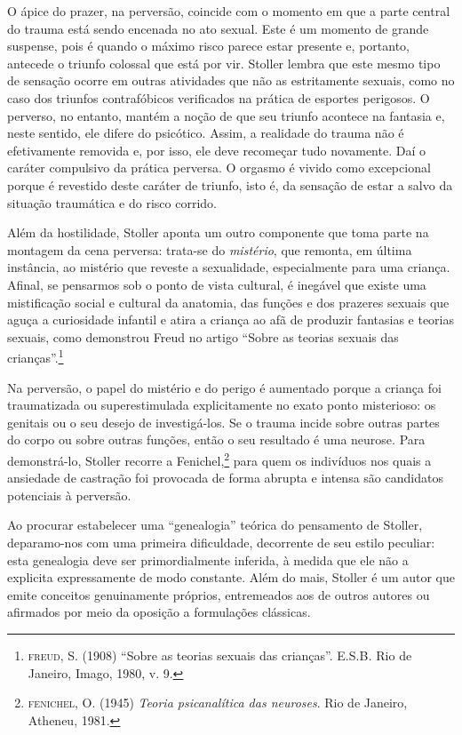 O ápice do prazer, na perversão, coincide com o momento em que a parte
central do trauma está sendo encenada no ato sexual. Este é um momento
de grande suspense, pois é quando o máximo risco parece estar presente
e, portanto, antecede o triunfo colossal que está por vir. Stoller
lembra que este mesmo tipo de sensação ocorre em outras atividades que
não as estritamente sexuais, como no caso dos triunfos contrafóbicos
verificados na prática de esportes perigosos. O perverso, no entanto,
mantém a noção de que seu triunfo acontece na fantasia e, neste sentido,
ele difere do psicótico. Assim, a realidade do trauma não é efetivamente
removida e, por isso, ele deve recomeçar tudo novamente. Daí o caráter
compulsivo da prática perversa. O orgasmo é vivido como excepcional
porque é revestido deste caráter de triunfo, isto é, da sensação de
estar a salvo da situação traumática e do risco corrido.

Além da hostilidade, Stoller aponta um outro componente que toma parte
na montagem da cena perversa: trata-se do \emph{mistério}, que remonta,
em última instância, ao mistério que reveste a sexualidade,
especialmente para uma criança. Afinal, se pensarmos sob o ponto de
vista cultural, é inegável que existe uma mistificação social e cultural
da anatomia, das funções e dos prazeres sexuais que aguça a curiosidade
infantil e atira a criança ao afã de produzir fantasias e teorias
sexuais, como demonstrou Freud no artigo ``Sobre as teorias sexuais das
crianças''.\footnote{\textsc{freud}, S. (1908) ``Sobre as teorias
  sexuais das crianças''. E.S.B\emph{.} Rio de Janeiro, Imago, 1980, v.
  9.}

Na perversão, o papel do mistério e do perigo é aumentado porque a
criança foi traumatizada ou superestimulada explicitamente no exato
ponto misterioso: os genitais ou o seu desejo de investigá-los. Se o
trauma incide sobre outras partes do corpo ou sobre outras funções,
então o seu resultado é uma neurose. Para demonstrá-lo, Stoller recorre
a Fenichel,\footnote{\textsc{fenichel}, O. (1945) \emph{Teoria
  psicanalítica das neuroses}. Rio de Janeiro, Atheneu, 1981.} para quem
os indivíduos nos quais a ansiedade de castração foi provocada de forma
abrupta e intensa são candidatos potenciais à perversão.

Ao procurar estabelecer uma ``genealogia'' teórica do pensamento de
Stoller, deparamo-nos com uma primeira dificuldade, decorrente de seu
estilo peculiar: esta genealogia deve ser primordialmente inferida, à
medida que ele não a explicita expressamente de modo constante. Além do
mais, Stoller é um autor que emite conceitos genuinamente próprios,
entremeados aos de outros autores ou afirmados por meio da oposição a
formulações clássicas.

